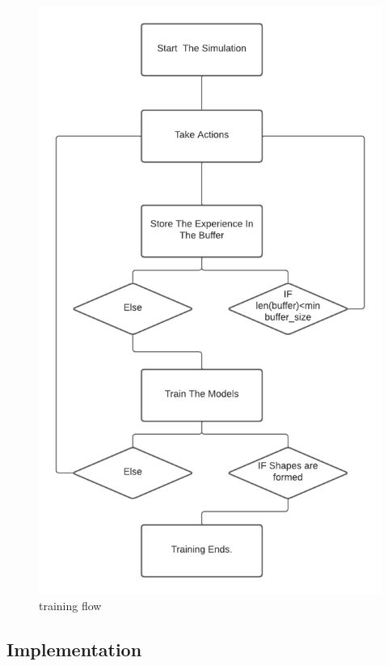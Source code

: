 \documentclass[12pt]{extarticle}
\begin{document}
 \begin{figure}[h!]  
\centering
\includegraphics[scale=1]{training_workflow3}
\caption[training flow]{training flow}
\end{figure}


\afterpage{\clearpage}

\newpage
\pagebreak
\hspace{0pt}
\vfill
\begin{center}
\section{Implementation}
\end{center}
\vfill
\hspace{0pt}
\end{document}
